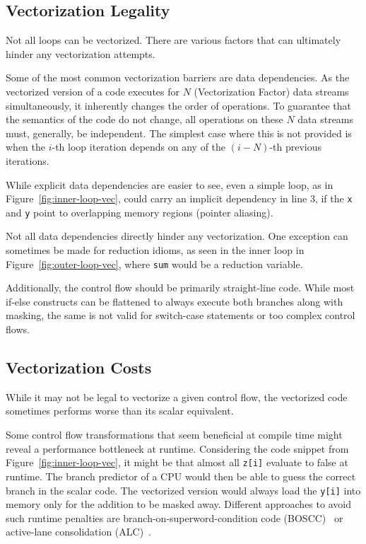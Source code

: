 \documentclass[sigplan,11pt,nonacm]{acmart}
\begin{document}
\subsection{Vectorization Legality}
Not all loops can be vectorized. There are various factors that can ultimately hinder any
vectorization attempts.

Some of the most common vectorization barriers are data dependencies. As the vectorized version
of a code executes for $N$ (Vectorization Factor) data streams simultaneously, it inherently changes
the order of operations. To guarantee that the semantics of the code do not change, all
operations on these $N$ data streams must, generally, be independent. The simplest case
where this is not provided is when the $i$-th loop iteration depends on any of the $(i-N)$-th 
previous iterations.

While explicit data dependencies are easier to see, even a simple loop, as in 
Figure~\ref{fig:inner-loop-vec}, could carry an implicit dependency in line 3, if
the \texttt{x} and \texttt{y} point to overlapping memory regions (pointer aliasing).

Not all data dependencies directly hinder any vectorization. One exception can 
sometimes be made for reduction idioms, as seen in the inner loop in 
Figure~\ref{fig:outer-loop-vec}, where \texttt{sum} would be a reduction variable.

Additionally, the control flow should be primarily straight-line code. While most if-else 
constructs can be flattened to always execute both branches along with masking, the same is not 
valid for switch-case statements or too complex control flows.

\subsection{Vectorization Costs}
While it may not be legal to vectorize a given control flow, the vectorized code sometimes 
performs worse than its scalar equivalent.

Some control flow transformations that seem beneficial at compile time might reveal a performance
bottleneck at runtime. Considering the code snippet from Figure~\ref{fig:inner-loop-vec}, it might
be that almost all \texttt{z[i]} evaluate to false at runtime. The branch predictor of a CPU
would then be able to guess the correct branch in the scalar code. The vectorized version would
always load the \texttt{y[i]} into memory only for the addition to be masked away. Different 
approaches to avoid such runtime penalties are branch-on-superword-condition code 
(BOSCC)~\cite{10.5555/1299042.1299055,llvmboscc} or active-lane 
consolidation (ALC)~\cite{10.1007/s11227-022-04359-w,10.5555/3615924.3615932}.
\end{document}
